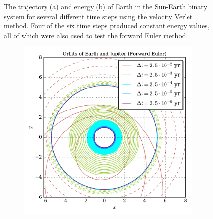 \documentclass[prb,aps,twocolumn,showpacs,10pt]{revtex4-1}
\begin{document}
\begin{figure}
\begin{subfigure}{.5\textwidth}
  \caption{\vspace*{1mm}}
  \label{fig:sub2}
\end{subfigure}
\caption{The trajectory (a) and energy (b) of Earth in the Sun-Earth binary system for several different time steps using the velocity Verlet method. Four of the six time steps produced constant energy values, all of which were also used to test the forward Euler method. }
\label{fig:test}
\end{figure}
\begin{figure}
\centering
\begin{subfigure}{.5\textwidth}
  \centering
  \includegraphics[width=\linewidth]{trinary_fixed_euler_orbit.pdf}
  \label{fig:sub1}
\end{subfigure}%
\begin{subfigure}{.5\textwidth}
  \centering

\end{subfigure}
\end{figure}
\end{document}

